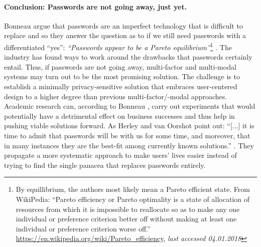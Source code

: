 	

\paragraph{Conclusion: Passwords are not going away, just yet.}
Bonneau \etal argue that passwords are an imperfect technology that is difficult to replace and so they answer the question as to if we still need passwords with a differentiated ``yes'': \textit{``Passwords appear to be a Pareto equilibrium''}\footnote{By equillibrium, the authors most likely mean a Pareto efficient state. From WikiPedia: ``Pareto efficiency or Pareto optimality is a state of allocation of resources from which it is impossible to reallocate so as to make any one individual or preference criterion better off without making at least one individual or preference criterion worse off.'' \url{https://en.wikipedia.org/wiki/Pareto_efficiency}, \textit{last accessed 04.01.2018}} \cite{Bonneau2015ImperfectAuthentication}. The industry has found ways to work around the drawbacks that passwords certainly entail. Thus, if passwords are not going away, multi-factor and multi-modal systems may turn out to be the most promising solution. The challenge is to establish a minimally privacy-sensitive solution that embraces user-centered design to a higher degree than previous multi-factor/-modal approaches. Academic research can, according to Bonneau \etal, carry out experiments that would potentially have a detrimental effect on business successes and thus help in pushing viable solutions forward. As Herley and van Oorshot point out: ``[...] it is time to admit that passwords will be with us for some time, and moreover, that in many instances they are the best-fit among currently known solutions.'' \cite{Herley2012PersistenceOfPasswords}. They propagate a more systematic approach to make users' lives easier instead of trying to find the single panacea that replaces passwords entirely.

